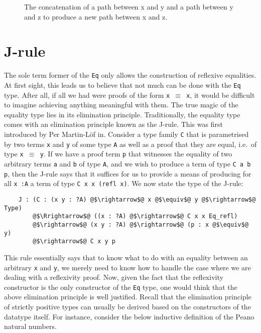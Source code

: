 \documentclass[12pt,twoside,maitrise]{dms}
\theoremstyle{definition}
\numberwithin{equation}{section}
\numberwithin{table}{chapter}
\numberwithin{figure}{chapter}
\newcommand\id[1] {\texttt{#1}}
\newcommand\fn[1] {\texttt{#1}}
\begin{document}
\begin{figure}

\caption{The concatenation of a path between x and y and a path between y and z to produce a new path between x and z.}\label{fig:eq-trans}
\end{figure}


\section{J-rule}\label{subsec:j-rule}
The sole term former of the \id{Eq} only allows the construction of reflexive
equalities. At first sight, this leads us to believe that not much can be done
with the \id{Eq} type. After all, if all we had were proofs of the form \fn{x
  $\equiv$ x}, it would be difficult to imagine achieving anything meaningful
with them. The true magic of the equality type lies in its elimination
principle. Traditionally, the equality type comes with an elimination principle
known as the J-rule. This was first introduced by Per Martin-Löf
in\cite{martin1975intuitionistic}. Consider a type family \id{C} that is
parametrised by two terms \id{x} and \id{y} of some type \id{A} as well as a
proof that they are equal, i.e.\ of type \fn{x $\equiv$ y}. If we have a proof
term \id{p} that witnesses the equality of two arbitrary terms \id{a} and \id{b}
of type \id{A}, and we wish to produce a term of type \fn{C a b p}, then the
J-rule says that it suffices for us to provide a means of producing for all
\fn{x :\@ A} a term of type \fn{C x x (refl x)}. We now state the type of the
J-rule:

\begin{verbatim}
    J : (C : (x y : ?A) @$\rightarrow$@ x @$\equiv$@ y @$\rightarrow$@ Type)
        @$\Rrightarrow$@ ((x : ?A) @$\rightarrow$@ C x x Eq_refl)
        @$\rightarrow$@ (x y : ?A) @$\rightarrow$@ (p : x @$\equiv$@ y)
        @$\rightarrow$@ C x y p
\end{verbatim}

This rule essentially says that to know what to do with an equality between an
arbitrary \id{x} and \id{y}, we merely need to know how to handle the case where
we are dealing with a reflexivity proof. Now, given the fact that the
reflexivity constructor is the only constructor of the \id{Eq} type, one would
think that the above elimination principle is well justified. Recall that the
elimination principle of strictly positive types\cite{abbott2005containers} can
usually be derived based on the constructors of the datatype itself. For
instance, consider the below inductive definition of the Peano natural numbers.
\end{document}
